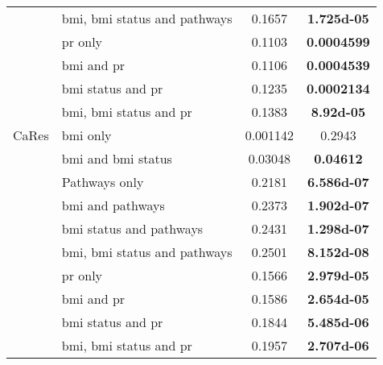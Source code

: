\begin{ThreePartTable}
\begin{longtable}{llcc}
                                          & \gls{bmi}, \gls{bmi} status and pathways & 0.1657     & \bfseries \num{1.725d-05}           \\
                                          & \gls{pr} only                            & 0.1103     & \bfseries 0.0004599                 \\
                                          & \gls{bmi} and \gls{pr}                   & 0.1106     & \bfseries 0.0004539                 \\
                                          & \gls{bmi} status and \gls{pr}            & 0.1235     & \bfseries 0.0002134                 \\
                                          & \gls{bmi}, \gls{bmi} status and \gls{pr} & 0.1383     & \bfseries \num{8.92d-05}            \\
				\hline
				\rule{0pt}{2.25ex}CaRes   & \gls{bmi} only                           & 0.001142   & 0.2943                              \\
                                          & \gls{bmi} and \gls{bmi} status           & 0.03048    & \bfseries 0.04612                   \\
                                          & Pathways only                            & 0.2181     & \bfseries \num{6.586d-07}           \\
                                          & \gls{bmi} and pathways                   & 0.2373     & \bfseries \num{1.902d-07}           \\
                                          & \gls{bmi} status and pathways            & 0.2431     & \bfseries \num{1.298d-07}           \\
                                          & \gls{bmi}, \gls{bmi} status and pathways & 0.2501     & \bfseries \num{8.152d-08}           \\
                                          & \gls{pr} only                            & 0.1566     & \bfseries \num{2.979d-05}           \\
                                          & \gls{bmi} and \gls{pr}                   & 0.1586     & \bfseries \num{2.654d-05}           \\
                                          & \gls{bmi} status and \gls{pr}            & 0.1844     & \bfseries \num{5.485d-06}           \\
                                          & \gls{bmi}, \gls{bmi} status and \gls{pr} & 0.1957     & \bfseries \num{2.707d-06}           \\

\end{longtable}
\end{ThreePartTable}
